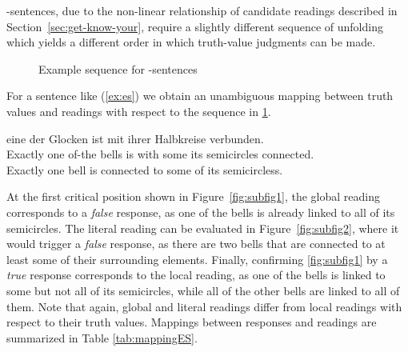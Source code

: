 \documentclass[fleqn,reqno,10pt,draft]{article}
\renewcommand{\es}{\acro{es}}
\begin{document}
\es-sentences, due to the non-linear relationship of candidate
readings described in Section~\ref{sec:get-know-your}, require a
slightly different sequence of unfolding which yields a different
order in which truth-value judgments can be made.
%
\begin{figure}[ht]
	\centering
	\caption[]{Example sequence for \es-sentences}
	\label{fig:exseqES}
\end{figure}
%
For a sentence like (\ref{ex:es}) we obtain an unambiguous
mapping between truth values and readings with respect to the sequence
in \ref{fig:exseqES}.
\begin{exe}
\ex \label{ex:es} \gll {} eine der Glocken ist mit
   ihrer Halbkreise verbunden.\\ 
  Exactly one of-the bells is with some its semicircles connected.\\
  \trans Exactly one bell is connected to some of its semicircless.
\end{exe}
At the first critical position shown in Figure~\ref{fig:subfig1}, the
global reading corresponds to a \emph{false} response, as one of the
bells is already linked to all of its semicircles. The literal reading
can be evaluated in Figure~\ref{fig:subfig2}, where it would trigger a
\emph{false} response, as there are two bells that are connected to at
least some of their surrounding elements. Finally, confirming
\ref{fig:subfig1} by a \emph{true} response corresponds to the local
reading, as one of the bells is linked to some but not all of its
semicircles, while all of the other bells are linked to all of
them. Note that again, global and literal readings differ from local
readings with respect to their truth values. Mappings between
responses and readings are summarized in Table \ref{tab:mappingES}.
\end{document}
